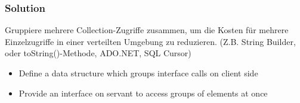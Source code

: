 \subsubsection{Solution}
Gruppiere mehrere Collection-Zugriffe zusammen, um die Kosten für mehrere Einzelzugriffe in einer verteilten Umgebung zu reduzieren. (Z.B. String Builder, oder toString()-Methode, ADO.NET, SQL Cursor)

\begin{itemize}
    \item Define a data structure which groups interface calls on client side
    \item Provide an interface on servant to access groups of elements at once
\end{itemize}
